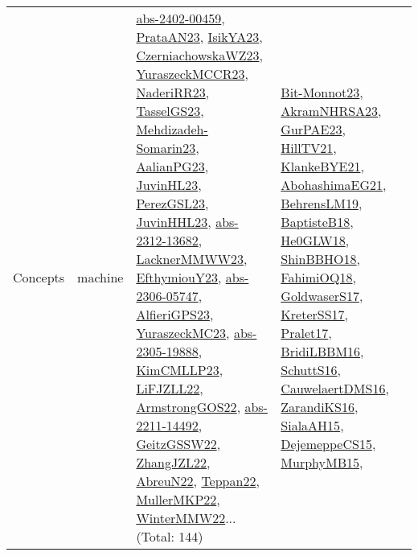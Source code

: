 {\begin{longtable}{lp{3cm}>{\raggedright}p{6cm}>{\raggedright}p{6cm}p{8cm}}
Concepts & machine & \href{articles/abs-2402-00459.pdf}{abs-2402-00459}\cite{abs-2402-00459}, \href{articles/PrataAN23.pdf}{PrataAN23}\cite{PrataAN23}, \href{articles/IsikYA23.pdf}{IsikYA23}\cite{IsikYA23}, \href{articles/CzerniachowskaWZ23.pdf}{CzerniachowskaWZ23}\cite{CzerniachowskaWZ23}, \href{articles/YuraszeckMCCR23.pdf}{YuraszeckMCCR23}\cite{YuraszeckMCCR23}, \href{articles/NaderiRR23.pdf}{NaderiRR23}\cite{NaderiRR23}, \href{papers/TasselGS23.pdf}{TasselGS23}\cite{TasselGS23}, \href{papers/Mehdizadeh-Somarin23.pdf}{Mehdizadeh-Somarin23}\cite{Mehdizadeh-Somarin23}, \href{papers/AalianPG23.pdf}{AalianPG23}\cite{AalianPG23}, \href{papers/JuvinHL23.pdf}{JuvinHL23}\cite{JuvinHL23}, \href{papers/PerezGSL23.pdf}{PerezGSL23}\cite{PerezGSL23}, \href{papers/JuvinHHL23.pdf}{JuvinHHL23}\cite{JuvinHHL23}, \href{articles/abs-2312-13682.pdf}{abs-2312-13682}\cite{abs-2312-13682}, \href{articles/LacknerMMWW23.pdf}{LacknerMMWW23}\cite{LacknerMMWW23}, \href{papers/EfthymiouY23.pdf}{EfthymiouY23}\cite{EfthymiouY23}, \href{articles/abs-2306-05747.pdf}{abs-2306-05747}\cite{abs-2306-05747}, \href{articles/AlfieriGPS23.pdf}{AlfieriGPS23}\cite{AlfieriGPS23}, \href{papers/YuraszeckMC23.pdf}{YuraszeckMC23}\cite{YuraszeckMC23}, \href{articles/abs-2305-19888.pdf}{abs-2305-19888}\cite{abs-2305-19888}, \href{papers/KimCMLLP23.pdf}{KimCMLLP23}\cite{KimCMLLP23}, \href{papers/LiFJZLL22.pdf}{LiFJZLL22}\cite{LiFJZLL22}, \href{papers/ArmstrongGOS22.pdf}{ArmstrongGOS22}\cite{ArmstrongGOS22}, \href{articles/abs-2211-14492.pdf}{abs-2211-14492}\cite{abs-2211-14492}, \href{papers/GeitzGSSW22.pdf}{GeitzGSSW22}\cite{GeitzGSSW22}, \href{papers/ZhangJZL22.pdf}{ZhangJZL22}\cite{ZhangJZL22}, \href{articles/AbreuN22.pdf}{AbreuN22}\cite{AbreuN22}, \href{papers/Teppan22.pdf}{Teppan22}\cite{Teppan22}, \href{articles/MullerMKP22.pdf}{MullerMKP22}\cite{MullerMKP22}, \href{papers/WinterMMW22.pdf}{WinterMMW22}\cite{WinterMMW22}... (Total: 144) & \href{papers/Bit-Monnot23.pdf}{Bit-Monnot23}\cite{Bit-Monnot23}, \href{articles/AkramNHRSA23.pdf}{AkramNHRSA23}\cite{AkramNHRSA23}, \href{articles/GurPAE23.pdf}{GurPAE23}\cite{GurPAE23}, \href{papers/HillTV21.pdf}{HillTV21}\cite{HillTV21}, \href{papers/KlankeBYE21.pdf}{KlankeBYE21}\cite{KlankeBYE21}, \href{articles/AbohashimaEG21.pdf}{AbohashimaEG21}\cite{AbohashimaEG21}, \href{papers/BehrensLM19.pdf}{BehrensLM19}\cite{BehrensLM19}, \href{articles/BaptisteB18.pdf}{BaptisteB18}\cite{BaptisteB18}, \href{papers/He0GLW18.pdf}{He0GLW18}\cite{He0GLW18}, \href{articles/ShinBBHO18.pdf}{ShinBBHO18}\cite{ShinBBHO18}, \href{articles/FahimiOQ18.pdf}{FahimiOQ18}\cite{FahimiOQ18}, \href{papers/GoldwaserS17.pdf}{GoldwaserS17}\cite{GoldwaserS17}, \href{articles/KreterSS17.pdf}{KreterSS17}\cite{KreterSS17}, \href{papers/Pralet17.pdf}{Pralet17}\cite{Pralet17}, \href{papers/BridiLBBM16.pdf}{BridiLBBM16}\cite{BridiLBBM16}, \href{papers/SchuttS16.pdf}{SchuttS16}\cite{SchuttS16}, \href{papers/CauwelaertDMS16.pdf}{CauwelaertDMS16}\cite{CauwelaertDMS16}, \href{articles/ZarandiKS16.pdf}{ZarandiKS16}\cite{ZarandiKS16}, \href{papers/SialaAH15.pdf}{SialaAH15}\cite{SialaAH15}, \href{papers/DejemeppeCS15.pdf}{DejemeppeCS15}\cite{DejemeppeCS15}, \href{papers/MurphyMB15.pdf}{MurphyMB15}\cite{MurphyMB15}, 
\end{longtable}}
